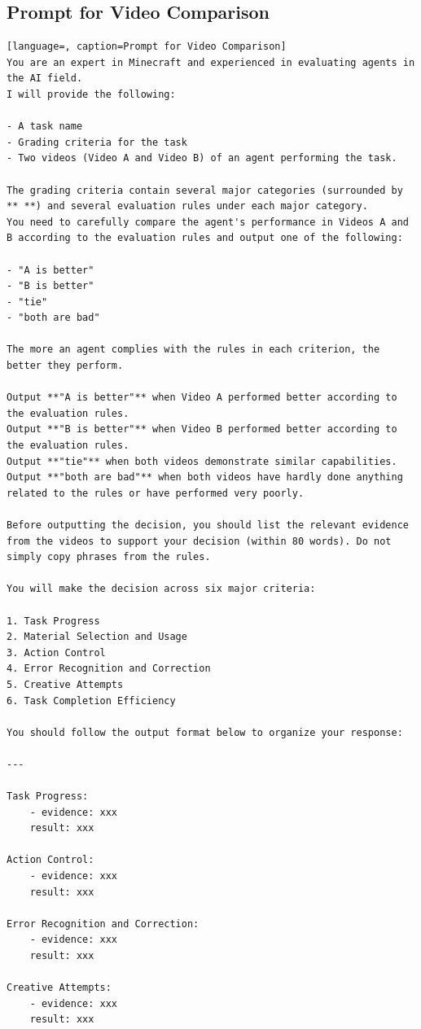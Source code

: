 \subsection{Prompt for Video Comparison}
\label{app:prompt_video_compare}
\begin{lstlisting}[language=, caption=Prompt for Video Comparison]
You are an expert in Minecraft and experienced in evaluating agents in the AI field.  
I will provide the following:

- A task name  
- Grading criteria for the task  
- Two videos (Video A and Video B) of an agent performing the task.

The grading criteria contain several major categories (surrounded by ** **) and several evaluation rules under each major category.  
You need to carefully compare the agent's performance in Videos A and B according to the evaluation rules and output one of the following:

- "A is better"  
- "B is better"  
- "tie"  
- "both are bad"

The more an agent complies with the rules in each criterion, the better they perform.

Output **"A is better"** when Video A performed better according to the evaluation rules.  
Output **"B is better"** when Video B performed better according to the evaluation rules.  
Output **"tie"** when both videos demonstrate similar capabilities.  
Output **"both are bad"** when both videos have hardly done anything related to the rules or have performed very poorly.

Before outputting the decision, you should list the relevant evidence from the videos to support your decision (within 80 words). Do not simply copy phrases from the rules.

You will make the decision across six major criteria:

1. Task Progress
2. Material Selection and Usage
3. Action Control
4. Error Recognition and Correction
5. Creative Attempts
6. Task Completion Efficiency

You should follow the output format below to organize your response:

---

Task Progress:
    - evidence: xxx  
    result: xxx

Action Control:
    - evidence: xxx  
    result: xxx

Error Recognition and Correction:
    - evidence: xxx  
    result: xxx

Creative Attempts:
    - evidence: xxx  
    result: xxx


\end{lstlisting}
